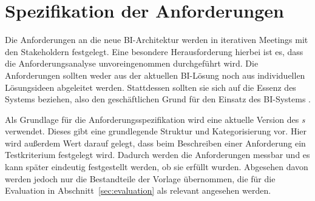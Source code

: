 \section{Spezifikation der Anforderungen}
Die Anforderungen an die neue BI-Architektur werden in iterativen Meetings mit den Stakeholdern festgelegt. Eine besondere Herausforderung hierbei ist es, dass die Anforderungsanalyse unvoreingenommen durchgeführt wird. Die Anforderungen sollten weder aus der aktuellen BI-Lösung noch aus individuellen Lösungsideen abgeleitet werden. Stattdessen sollten sie sich auf die Essenz des Systems beziehen, also den geschäftlichen Grund für den Einsatz des BI-Systems \cite[vgl.][]{robertson_mastering_2013}.

Als Grundlage für die Anforderungsspezifikation wird eine aktuelle Version des \textit{s} \cite{robertson_volere_2020} verwendet. Dieses gibt eine grundlegende Struktur und Kategorisierung vor. Hier wird außerdem Wert darauf gelegt, dass beim Beschreiben einer Anforderung ein Testkriterium festgelegt wird. Dadurch werden die Anforderungen messbar und es kann später eindeutig festgestellt werden, ob sie erfüllt wurden. Abgesehen davon werden jedoch nur die Bestandteile der Vorlage übernommen, die für die Evaluation in Abschnitt~\ref{sec:evaluation} als relevant angesehen werden.